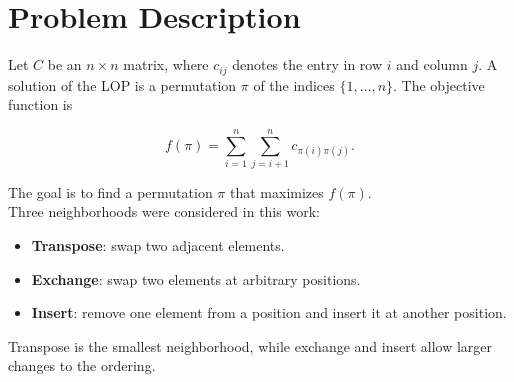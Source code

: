 \section{Problem Description}\label{sec:problemDescription}


Let \(C\) be an \(n \times n\) matrix, where \(c_{ij}\) denotes the entry in row \(i\) and column \(j\). A solution of the LOP is a permutation \(\pi\) of the indices \(\{1,\dots,n\}\). The objective function is

\[
f(\pi) = \sum_{i=1}^{n} \sum_{j=i+1}^{n} c_{\pi(i)\pi(j)}.
\]

The goal is to find a permutation \(\pi\) that maximizes \(f(\pi)\).
\\
Three neighborhoods were considered in this work:
\begin{itemize}[leftmargin=1.5em]
    \item \textbf{Transpose}: swap two adjacent elements.
    \item \textbf{Exchange}: swap two elements at arbitrary positions.
    \item \textbf{Insert}: remove one element from a position and insert it at another position.
\end{itemize}

Transpose is the smallest neighborhood, while exchange and insert allow larger changes to the ordering.
